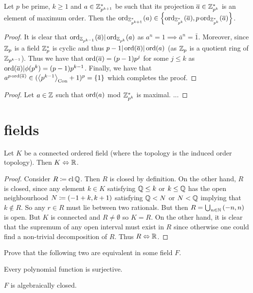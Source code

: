 \documentclass[8pt,a4paper]{article}
\begin{document}
\begin{lemma}
    Let $p$ be prime, $k\geq 1$ and $a\in\mathbb{Z}^*_{p^{k+1}}$ be such that its projection $\overline{a}\in\mathbb{Z}^*_{p^k}$ is an element of maximum order. Then the $\ord_{\ints^*_{p^{k+1}}}(a)\in\set{\ord_{\ints^*_{p^k}}(\bar{a}),p\ord_{\ints^*_{p^k}}(\bar{a})}$.
\end{lemma}

\begin{proof}
    It is clear that $\mathop\mathrm{ord}_{\mathbb{Z}_{p^{k-1}}}(\overline{a})|\mathop\mathrm{ord}_{\mathbb{Z}_{p^k}}(a)$ as $a^n=1\implies \bar{a}^n=\bar{1}$. Moreover, since $\mathbb{Z}_p$ is a field $\mathbb{Z}^*_p$ is cyclic and thus $p-1|\mathop\mathrm{ord}(\overline{a})|\mathop\mathrm{ord}(a)$ (as $\mathbb{Z}_p$ is a quotient ring of $\mathbb{Z}_{p^{k-1}}$). Thus we have that $\mathop\mathrm{ord}(\overline{a})=(p-1)p^j$ for some $j\leq k$ as $\mathop\mathrm{ord}(\overline{a})|\phi(p^k)=(p-1)p^{k-1}$. Finally, we have that $a^{p\ord(\bar{a})}\in (\gen{p^{k-1}}_{\Con}+1)^p=\set{1}$ which completes the proof.
\end{proof}

\begin{proof}
    Let $a\in \mathbb{Z}$ such that $\mathop\mathrm{ord}(a)$ mod $\mathbb{Z}^*_{p^k}$ is maximal. ...
\end{proof}

\section{fields}

\begin{lemma}
    Let $K$ be a connected ordered field (where the topology is the induced order topology). Then $K\Leftrightarrow \mathbb{R}$. 
\end{lemma}

\begin{proof}
    Consider $R\mathrel{\mathrel{\mathop:}\mkern-1.2mu=}\mathop\mathrm{cl} \mathbb{Q}$. Then $R$ is closed by definition. On the other hand, $R$ is closed, since any element $k\in K$ satisfying $\mathbb{Q} \leq k$ or $k \leq \mathbb{Q}$ has the open neighbourhood $N\mathrel{\mathrel{\mathop:}\mkern-1.2mu=} (-1+k,k+1)$ satisfying $\mathbb{Q} < N$ or $N < \mathbb{Q}$ implying that $k\not\in R$. So any $r\in R$ must lie between two rationals. But then $R=\bigcup_{n\in\mathbb{N}}{(-n,n)}$ is open. But $K$ is connected and $R\neq\emptyset$ so $K=R$. On the other hand, it is clear that the supremum of any open interval must exist in $R$ since otherwise one could find a non-trivial decomposition of $R$. Thus $R\Leftrightarrow \mathbb{R}$. 
\end{proof}

\begin{exercise}
    Prove that the following two are equivalent in some field $F$.
    \begin{statements}
        \item Every polynomial function is surjective.
        \item $F$ is algebraically closed.
    \end{statements}
\end{exercise}
\end{document}
